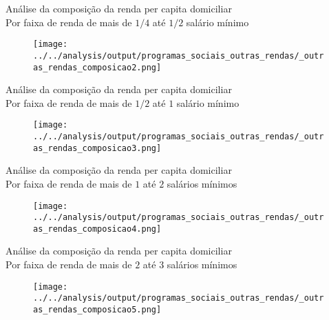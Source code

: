 \begin{frame}[label=_outras_rendas_composicao2]{{\small Análise da composição da renda per capita domiciliar \\  Por faixa de renda de mais de $1/4$ até $1/2$ salário mínimo}}
\textit{\hyperlink{_outras_rendas_composicao}{}}
\begin{figure}
  \centering
  \texttt{[image: ../../analysis/output/programas\_sociais\_outras\_rendas/\_outras\_rendas\_composicao2.png]}
  \caption{}
  \label{fig:_outras_rendas_composicao2}
\end{figure}
\end{frame}


\begin{frame}[label=_outras_rendas_composicao3]{{\small Análise da composição da renda per capita domiciliar \\  Por faixa de renda de mais de $1/2$ até $1$ salário mínimo}}
\textit{\hyperlink{_outras_rendas_composicao}{}}
\begin{figure}
  \centering
  \texttt{[image: ../../analysis/output/programas\_sociais\_outras\_rendas/\_outras\_rendas\_composicao3.png]}
  \caption{}
  \label{fig:_outras_rendas_composicao3}
\end{figure}
\end{frame}



\begin{frame}[label=_outras_rendas_composicao4]{{\small Análise da composição da renda per capita domiciliar \\  Por faixa de renda de mais de $1$ até $2$ salários mínimos}}
\textit{\hyperlink{_outras_rendas_composicao}{}}
\begin{figure}
  \centering
  \texttt{[image: ../../analysis/output/programas\_sociais\_outras\_rendas/\_outras\_rendas\_composicao4.png]}
  \caption{}
  \label{fig:_outras_rendas_composicao4}
\end{figure}
\end{frame}


\begin{frame}[label=_outras_rendas_composicao5]{{\small Análise da composição da renda per capita domiciliar \\  Por faixa de renda de mais de $2$ até $3$ salários mínimos}}
\textit{\hyperlink{_outras_rendas_composicao}{}}
\begin{figure}
  \centering
  \texttt{[image: ../../analysis/output/programas\_sociais\_outras\_rendas/\_outras\_rendas\_composicao5.png]}
  \caption{}
  \label{fig:_outras_rendas_composicao5}
\end{figure}
\end{frame}


